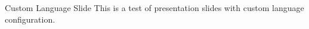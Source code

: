 \documentclass[14pt,t]{beamer}
\begin{document}
\begin{frame}{Custom Language Slide}
This is a test of presentation slides with custom language configuration.
\end{frame}
\end{document}
